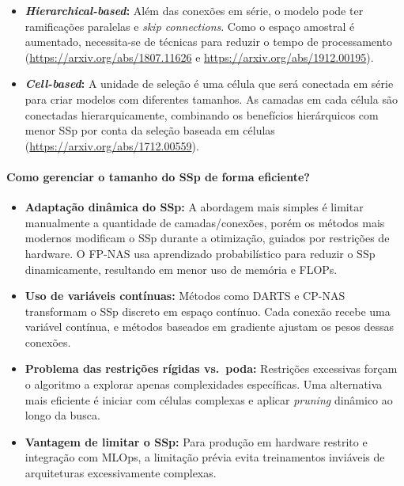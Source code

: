 \documentclass[a4paper,12pt]{article}
\begin{document}
\begin{appendices}
\begin{itemize}[noitemsep]
    \item \textbf{\textit{Hierarchical-based}:} Além das conexões em série, o modelo pode ter ramificações paralelas e \textit{skip connections}. Como o espaço amostral é aumentado, necessita-se de técnicas para reduzir o tempo de processamento (\url{https://arxiv.org/abs/1807.11626} e \url{https://arxiv.org/abs/1912.00195}).

    \item \textbf{\textit{Cell-based}:} A unidade de seleção é uma célula que será conectada em série para criar modelos com diferentes tamanhos. As camadas em cada célula são conectadas hierarquicamente, combinando os benefícios hierárquicos com menor SSp por conta da seleção baseada em células (\url{https://arxiv.org/abs/1712.00559}).
\end{itemize}

\paragraph{Como gerenciar o tamanho do SSp de forma eficiente?}

\begin{itemize}
    \item \textbf{Adaptação dinâmica do SSp:} A abordagem mais simples é limitar manualmente a quantidade de camadas/conexões, porém os métodos mais modernos modificam o SSp durante a otimização, guiados por restrições de hardware. O FP-NAS usa aprendizado probabilístico para reduzir o SSp dinamicamente, resultando em menor uso de memória e FLOPs.

    \item \textbf{Uso de variáveis contínuas:} Métodos como DARTS e CP-NAS transformam o SSp discreto em espaço contínuo. Cada conexão recebe uma variável contínua, e métodos baseados em gradiente ajustam os pesos dessas conexões.

    \item \textbf{Problema das restrições rígidas vs.\ poda:} Restrições excessivas forçam o algoritmo a explorar apenas complexidades específicas. Uma alternativa mais eficiente é iniciar com células complexas e aplicar \textit{pruning} dinâmico ao longo da busca.

    \item \textbf{Vantagem de limitar o SSp:} Para produção em hardware restrito e integração com MLOps, a limitação prévia evita treinamentos inviáveis de arquiteturas excessivamente complexas.
\end{itemize}


\end{appendices}
\end{document}
